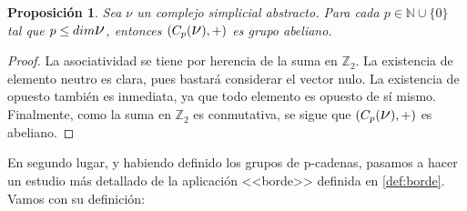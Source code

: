 \documentclass[12pt, a4paper]{article}
\numberwithin{equation}{section}
\theoremstyle{definition}
\theoremstyle{remark}
\theoremstyle{plain}
\newtheorem{prop}{Proposición}
\begin{document}
	\begin{prop}
		\label{prop:abel}
		Sea {\Large $\nu$} un complejo simplicial abstracto. Para cada 
		$p \in \mathbb{N}\cup\{0\}$ tal que $p \leq dim\text{{\Large $\nu$}}$, 
		entonces $(C_{p}(\text{{\Large $\nu$}}), +)$ es grupo 
		abeliano.
	\end{prop}

	\begin{proof}
		La asociatividad se tiene por herencia de la suma en 
		$\mathbb{Z}_{2}$. La existencia de elemento neutro es clara, 
		pues bastará considerar el vector nulo. La existencia de 
		opuesto también es inmediata, ya que todo elemento es opuesto 
		de sí mismo. Finalmente, como la suma en $\mathbb{Z}_{2}$ es 
		conmutativa, se sigue que $(C_{p}(\text{{\Large $\nu$}}), +)$
		es abeliano.
	\end{proof}

	En segundo lugar, y habiendo definido los grupos de p-cadenas, pasamos
	a hacer un estudio más detallado de la aplicación <<borde>> definida 
	en \ref{def:borde}. Vamos con su definición:
\end{document}
